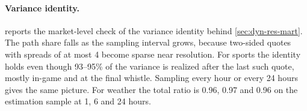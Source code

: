 
\paragraph{Variance identity.}
 reports the market-level check of the variance identity behind
\cref{sec:dyn-res-mart}.
The path share falls as the sampling interval grows,
  because two-sided quotes with spreads of at most 4\cents{} become sparse near resolution.
For sports the identity holds even though 93--95\% of the variance is realized after the
  last such quote, mostly in-game and at the final whistle.
Sampling every hour or every 24 hours gives the same picture.
  For weather the total ratio is 0.96, 0.97 and 0.96 on the estimation sample at 1, 6 and 24 hours.

